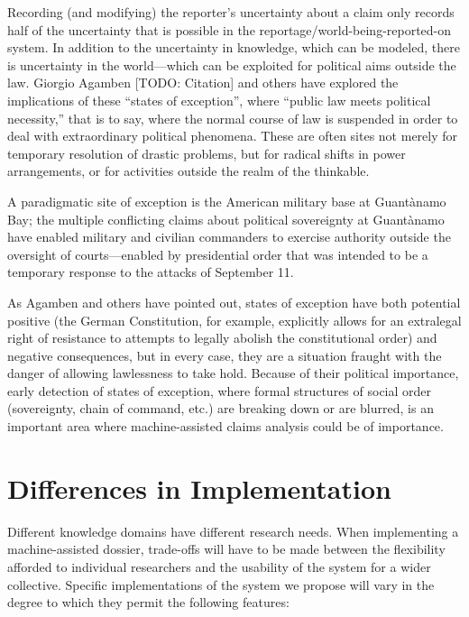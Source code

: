 \documentclass[format=siggraph, review=true]{acmart}
\begin{document}
Recording (and modifying) the reporter's uncertainty about a claim only records half of the uncertainty that is possible in the reportage/world-being-reported-on system. In addition to the uncertainty in knowledge, which can be modeled, there is uncertainty in the world—which can be exploited for political aims outside the law. Giorgio Agamben [TODO: Citation] and others have explored the implications of these ``states of exception'', where ``public law meets political necessity,'' that is to say, where the normal course of law is suspended in order to deal with extraordinary political phenomena.  These are often sites not merely for temporary resolution of drastic problems, but for radical shifts in power arrangements, or for activities outside the realm of the thinkable.  

A paradigmatic site of exception is the American military base at Guantànamo Bay; the multiple conflicting claims about political sovereignty at Guantànamo have enabled military and civilian commanders to exercise authority outside the oversight of courts—enabled by presidential order that was intended to be a temporary response to the attacks of September 11. 

As Agamben and others have pointed out, states of exception have both potential positive (the German Constitution, for example, explicitly allows for an extralegal right of resistance to attempts to legally abolish the constitutional order) and negative consequences, but in every case, they are a situation fraught with the danger of allowing lawlessness to take hold. Because of their political importance, early detection of states of exception, where formal structures of social order (sovereignty, chain of command, etc.) are breaking down or are blurred, is an important area where machine-assisted claims analysis could be of importance. 

\section{Differences in Implementation}

Different knowledge domains have different research needs. When
implementing a machine-assisted dossier, trade-offs will have to be made
between the flexibility afforded to individual researchers and the
usability of the system for a wider collective. Specific implementations
of the system we propose will vary in the degree to which they permit
the following features:
\end{document}
